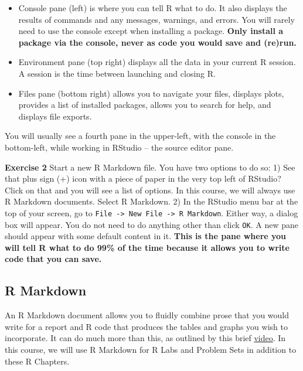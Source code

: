 \documentclass[
]{book}
\providecommand{\tightlist}{%
  \setlength{\itemsep}{0pt}\setlength{\parskip}{0pt}}
\newenvironment{rmdblock}[1]
  {\begin{shaded*}
  }
  {\end{shaded*}
  }
\newenvironment{learncheck}
  {\begin{rmdblock}{warning}}
  {\end{rmdblock}}
\begin{document}
\begin{itemize}
\tightlist
\item
  Console pane (left) is where you can tell R what to do. It also displays the results of commands and any messages, warnings, and errors. You will rarely need to use the console except when installing a package. \textbf{Only install a package via the console, never as code you would save and (re)run.}
\item
  Environment pane (top right) displays all the data in your current R session. A session is the time between launching and closing R.
\item
  Files pane (bottom right) allows you to navigate your files, displays plots, provides a list of installed packages, allows you to search for help, and displays file exports.
\end{itemize}

You will usually see a fourth pane in the upper-left, with the console in the bottom-left, while working in RStudio -- the source editor pane.

\begin{learncheck}
\textbf{Exercise 2} Start a new R Markdown file. You have two options to
do so: 1) See that plus sign (+) icon with a piece of paper in the very
top left of RStudio? Click on that and you will see a list of options.
In this course, we will always use R Markdown documents. Select R
Markdown. 2) In the RStudio menu bar at the top of your screen, go to
\texttt{File\ -\textgreater{}\ New\ File\ -\textgreater{}\ R\ Markdown}.
Either way, a dialog box will appear. You do not need to do anything
other than click \texttt{OK}. A new pane should appear with some default
content in it. \textbf{This is the pane where you will tell R what to do
99\% of the time because it allows you to write code that you can save.}
\end{learncheck}

\hypertarget{r-markdown}{%
\subsection{R Markdown}\label{r-markdown}}

An R Markdown document allows you to fluidly combine prose that you would write for a report and R code that produces the tables and graphs you wish to incorporate. It can do much more than this, as outlined by this brief \href{https://rmarkdown.rstudio.com/lesson-1.html}{video}. In this course, we will use R Markdown for R Labs and Problem Sets in addition to these R Chapters.
\end{document}
